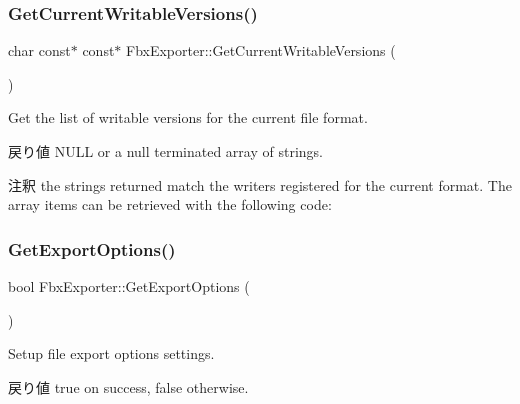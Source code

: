 \subsubsection{\texorpdfstring{Get\+Current\+Writable\+Versions()}{GetCurrentWritableVersions()}}
{\footnotesize\ttfamily char const$\ast$ const$\ast$ Fbx\+Exporter\+::\+Get\+Current\+Writable\+Versions (\begin{DoxyParamCaption}{ }\end{DoxyParamCaption})}

Get the list of writable versions for the current file format. \begin{DoxyReturn}{戻り値}
{\ttfamily N\+U\+LL} or a null terminated array of strings. 
\end{DoxyReturn}
\begin{DoxyRemark}{注釈}
the strings returned match the writers registered for the current format. The array items can be retrieved with the following code\+: 
 
\end{DoxyRemark}
\mbox{\label{class_fbx_exporter_a1d698ddca2a7720a3c05b00afea5b413}} 
\subsubsection{\texorpdfstring{Get\+Export\+Options()}{GetExportOptions()}\hspace{0.1cm}{\footnotesize\ttfamily [1/2]}}
{\footnotesize\ttfamily bool Fbx\+Exporter\+::\+Get\+Export\+Options (\begin{DoxyParamCaption}{ }\end{DoxyParamCaption})}

Setup file export options settings. \begin{DoxyReturn}{戻り値}
{\ttfamily true} on success, {\ttfamily false} otherwise. 
\end{DoxyReturn}
\mbox{\label{class_fbx_exporter_a0e26854a47b1fdbc100332b131552b7e}} 
